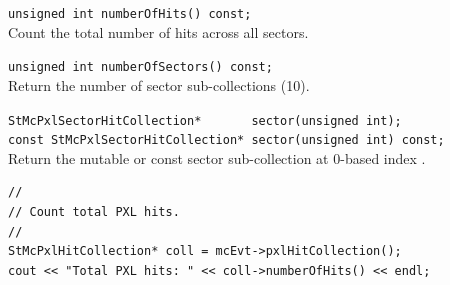 \begin{Entry}
    \verb+unsigned int numberOfHits() const;+\\
    Count the total number of hits across all sectors.

    \verb+unsigned int numberOfSectors() const;+\\
    Return the number of sector sub-collections (10).

    \verb+StMcPxlSectorHitCollection*       sector(unsigned int);+\\
    \verb+const StMcPxlSectorHitCollection* sector(unsigned int) const;+\\
    Return the mutable or const sector sub-collection at 0-based index
    .

\item[Examples]
{\footnotesize
\begin{verbatim}
//
// Count total PXL hits.
//
StMcPxlHitCollection* coll = mcEvt->pxlHitCollection();
cout << "Total PXL hits: " << coll->numberOfHits() << endl;
\end{verbatim}
}%
\end{Entry}
\clearpage

%
%
